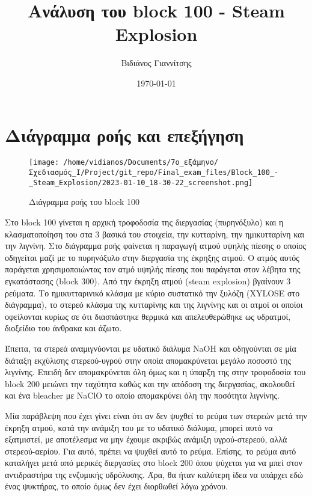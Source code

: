 \documentclass[11pt]{article}
\author{Βιδιάνος Γιαννίτσης}
\date{\today}
\title{Ανάλυση του block 100 - Steam Explosion}
\begin{document}
\maketitle
\tableofcontents

\renewcommand{\abstractname}{Περίληψη}
\renewcommand{\tablename}{Πίνακας}
\renewcommand{\figurename}{Σχήμα}
\renewcommand\listingscaption{Κώδικας}

\section{Διάγραμμα ροής και επεξήγηση}
\label{sec:orgab1a710}
\begin{figure}[htbp]
\centering
\texttt{[image: /home/vidianos/Documents/7o\_εξάμηνο/Σχεδιασμός\_Ι/Project/git\_repo/Final\_exam\_files/Block\_100\_-\_Steam\_Explosion/2023-01-10\_18-30-22\_screenshot.png]}
\caption{Διάγραμμα ροής του block 100}
\end{figure}

Στο block 100 γίνεται η αρχική τροφοδοσία της διεργασίας (πυρηνόξυλο) και η κλασματοποίηση του στα 3 βασικά του στοιχεία, την κυτταρίνη, την ημικυτταρίνη και την λιγνίνη. Στο διάγραμμα ροής φαίνεται η παραγωγή ατμού υψηλής πίεσης ο οποίος οδηγείται μαζί με το πυρηνόξυλο στην διεργασία της έκρηξης ατμού. Ο ατμός αυτός παράγεται χρησιμοποιώντας τον ατμό υψηλής πίεσης που παράγεται στον λέβητα της εγκατάστασης (block 300). Από την έκρηξη ατμού (steam explosion) βγαίνουν 3 ρεύματα. Το ημικυτταρινικό κλάσμα με κύριο συστατικό την ξυλόζη (XYLOSE στο διάγραμμα), το στερεό κλάσμα της κυτταρίνης και της λιγνίνης και οι ατμοί οι οποίοι οφείλονται κυρίως σε ότι διασπάστηκε θερμικά και απελευθερώθηκε ως υδρατμοί, διοξείδιο του άνθρακα και άζωτο.

Έπειτα, τα στερεά αναμιγνύονται με υδατικό διάλυμα NaOH και οδηγούνται σε μία διάταξη εκχύλισης στερεού-υγρού στην οποία απομακρύνεται μεγάλο ποσοστό της λιγνίνης. Επειδή δεν απομακρύνεται όλη όμως και η ύπαρξη της στην τροφοδοσία του block 200 μειώνει την ταχύτητα καθώς και την απόδοση της διεργασίας, ακολουθεί και ένα bleacher με NaClO το οποίο απομακρύνει όλη την ποσότητα λιγνίνης.

Μία παράβλεψη που έχει γίνει είναι ότι αν δεν ψυχθεί το ρεύμα των στερεών μετά την έκρηξη ατμού, κατά την ανάμιξη του με το υδατικό διάλυμα, μπορεί αυτό να εξατμιστεί, με αποτέλεσμα να μην έχουμε ακριβώς ανάμιξη υγρού-στερεού, αλλά στερεού-αερίου. Για αυτό, πρέπει να ψυχθεί αυτό το ρεύμα. Επίσης, το ρεύμα αυτό καταλήγει μετά από μερικές διεργασίες στο block 200 όπου ψύχεται για να μπεί στον αντιδραστήρα της ενζυμικής υδρόλυσης. Άρα, θα ήταν καλύτερη ίδεα να υπάρχει εδώ ένας ψυκτήρας, το οποίο όμως δεν έχει διορθωθεί λόγω χρόνου.
\end{document}
